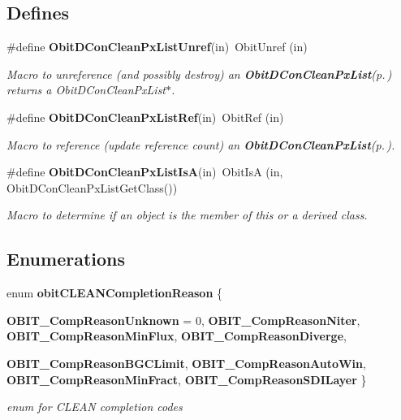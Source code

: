 \subsection*{Defines}
\begin{CompactItemize}
\item 
\#define {\bf Obit\-DCon\-Clean\-Px\-List\-Unref}(in)\ Obit\-Unref (in)
\begin{CompactList}\small\item\em Macro to unreference (and possibly destroy) an {\bf Obit\-DCon\-Clean\-Px\-List}{\rm (p.\,\pageref{structObitDConCleanPxList})} returns a Obit\-DCon\-Clean\-Px\-List$\ast$. \item\end{CompactList}\item 
\#define {\bf Obit\-DCon\-Clean\-Px\-List\-Ref}(in)\ Obit\-Ref (in)
\begin{CompactList}\small\item\em Macro to reference (update reference count) an {\bf Obit\-DCon\-Clean\-Px\-List}{\rm (p.\,\pageref{structObitDConCleanPxList})}. \item\end{CompactList}\item 
\#define {\bf Obit\-DCon\-Clean\-Px\-List\-Is\-A}(in)\ Obit\-Is\-A (in, Obit\-DCon\-Clean\-Px\-List\-Get\-Class())
\begin{CompactList}\small\item\em Macro to determine if an object is the member of this or a derived class. \item\end{CompactList}\end{CompactItemize}
\subsection*{Enumerations}
\begin{CompactItemize}
\item 
enum {\bf obit\-CLEANCompletion\-Reason} \{ \par
{\bf OBIT\_\-Comp\-Reason\-Unknown} = 0, 
{\bf OBIT\_\-Comp\-Reason\-Niter}, 
{\bf OBIT\_\-Comp\-Reason\-Min\-Flux}, 
{\bf OBIT\_\-Comp\-Reason\-Diverge}, 
\par
{\bf OBIT\_\-Comp\-Reason\-BGCLimit}, 
{\bf OBIT\_\-Comp\-Reason\-Auto\-Win}, 
{\bf OBIT\_\-Comp\-Reason\-Min\-Fract}, 
{\bf OBIT\_\-Comp\-Reason\-SDILayer}
 \}
\begin{CompactList}\small\item\em enum for CLEAN completion codes \item\end{CompactList}\end{CompactItemize}
